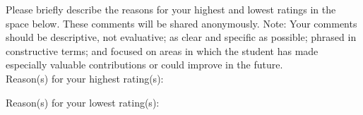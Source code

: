 \documentclass[11pt]{article}
\begin{document}
Please briefly describe the reasons for your highest and lowest ratings in the space below. These comments will be shared anonymously. Note: Your comments should be descriptive, not evaluative; as clear and specific as possible; phrased in constructive terms; and focused on areas in which the student has made especially valuable contributions or could improve in the future. \\

\noindent Reason(s) for your highest rating(s): \\

\vspace{2cm}

\noindent Reason(s) for your lowest rating(s):
\end{document}
